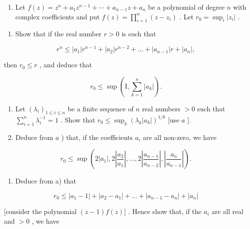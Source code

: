 \ExerciseSection

\begin{enumerate}
\def\labelenumi{\arabic{enumi})}
\tightlist
\item
  Let \(f(z) = z^n + a_1z^{n-1} + \cdots + a_{n-1}z + a_n\) be a polynomial of degree \(n\) with complex coefficients and put \(f(z) = \prod_{i=1}^{n}(z - z_i)\) . Let \(r_0 = \sup_i |z_i|\) .
\end{enumerate}

\begin{enumerate}
\def\labelenumi{\alph{enumi})}
\tightlist
\item
  Show that if the real number \(r > 0\) is such that
\end{enumerate}

\[
r ^ {n} \leqslant | a _ {1} | r ^ {n - 1} + | a _ {2} | r ^ {n - 2} + \dots + | a _ {n - 1} | r + | a _ {n} |,
\]

then \(r_0 \leqslant r\) , and deduce that

\[
r _ {0} \leqslant \sup \left(\mathrm{I}, \sum_ {k = 1} ^ {n} | a _ {k} |\right).
\]

\begin{enumerate}
\def\labelenumi{\alph{enumi})}
\setcounter{enumi}{1}
\item
  Let \((\lambda_i)_{1 \leqslant i \leqslant n}\) be a finite sequence of \(n\) real numbers \(>0\) such that \(\sum_{i=1}^{n} \lambda_i^{-1} = 1\) . Show that \(r_0 \leqslant \sup_k (\lambda_k |a_k|)^{1/k}\) {[}use \(a\) {]}.
\item
  Deduce from \(a\) ) that, if the coefficients \(a_i\) are all non-zero, we have
\end{enumerate}

\[
r _ {0} \leqslant \sup \left(2 | a _ {1} |, 2 \left| \frac {a _ {2}}{a _ {1}} \right|, \dots , 2 \left| \frac {a _ {n - 1}}{a _ {n - 2}} \right|, \left| \frac {a _ {n}}{a _ {n - 1}} \right|\right).
\]

\begin{enumerate}
\def\labelenumi{\alph{enumi})}
\setcounter{enumi}{3}
\tightlist
\item
  Deduce from a) that
\end{enumerate}

\[
r _ {0} \leqslant | a _ {1} - 1 | + | a _ {2} - a _ {1} | + \dots + | a _ {n - 1} - a _ {n} | + | a _ {n} |
\]

{[}consider the polynomial \((z - 1)f(z)]\) . Hence show that, if the \(a_i\) are all real and \(>0\) , we have

